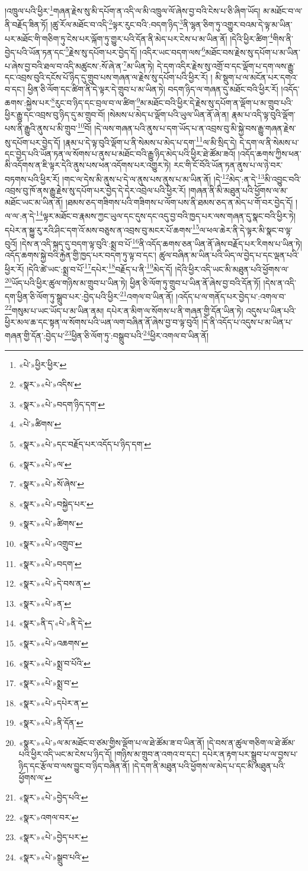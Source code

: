 །འཁྲུལ་པའི་ཕྱིར་\footnote{«པེ་»ཕྱིར་ཕྱིར་}གཞན་རྗེས་སུ་མི་དཔོག་ན་འདི་ལ་མི་འཁྲུལ་ལོ་ཞེས་བྱ་བའི་ངེས་པ་ཅི་ཞིག་ཡོད། མ་མཐོང་བ་ལ་ནི་བརྗོད་ཟིན་ཏོ། །ཚུ་རོལ་མཐོང་བ་འདི་\footnote{«སྣར་»«པེ་»འདིས་}ལྟར་རུང་བའི་:བདག་ཉིད་\footnote{«སྣར་»«པེ་»བདག་ཉིད་དག་}ནི་ལྷན་ཅིག་ཏུ་འགྱུར་བའམ་དེ་ལྟ་མ་ཡིན་པར་མཐོང་གི་གཅིག་ཏུ་ངེས་པར་ལྐོག་ཏུ་གྱུར་པའི་དོན་ནི་མེད་པར་ངེས་པ་མ་ཡིན་ནོ། །དེའི་ཕྱིར་ཚིག་\footnote{«པེ་»ཚིགས་}གིས་ནི་བྱེད་པའི་ཡོན་ཏན་དང་\footnote{«སྣར་»«པེ་»དང་བརྗོད་པར་འདོད་པ་ཉིད་དག་}རྗེས་སུ་དཔོག་པར་བྱེད་དོ། །འདིར་ཡང་བདག་ལས་\footnote{«སྣར་»«པེ་»ལ་}མཐོང་བས་རྗེས་སུ་དཔོག་པ་མ་ཡིན་པ་ཞེས་བྱ་བའི་ཐལ་བ་འདི་མཚུངས་:སོ་ཞེ་ན་\footnote{«སྣར་»«པེ་»སོ་ཞེས་}མ་ཡིན་ཏེ། དེ་དག་འདིར་རྗེས་སུ་འགྲོ་བ་དང་ལྡོག་པ་དག་ལས་རྒྱུ་དང་འབྲས་བུའི་དངོས་པོ་ཉིད་དུ་གྲུབ་པས་གཞན་ལ་རྗེས་སུ་དཔོག་པའི་ཕྱིར་རོ། །
མི་སྡུག་པ་ལ་མངོན་པར་དགའ་བ་དང་། ཕྱིན་ཅི་ལོག་དང་ཚིག་ནི་དེ་ལྟར་དེ་གྲུབ་པ་མ་ཡིན་ཏེ། བདག་ཉིད་ལ་གཞན་དུ་མཐོང་བའི་ཕྱིར་རོ། །འདོད་ཆགས་:སྐྱེས་པར་\footnote{«སྣར་»«པེ་»བསྐྱེད་པར་}རུང་བ་ཉིད་དང་བྲལ་བ་ལ་ཚིག་\footnote{«སྣར་»«པེ་»ཚིགས་}མ་མཐོང་བའི་ཕྱིར་དེ་རྗེས་སུ་དཔོག་ན་ལྡོག་པ་མ་གྲུབ་པའི་ཕྱིར་རྒྱུ་དང་འབྲས་བུ་ཉིད་དུ་མ་གྲུབ་བོ། །སེམས་པ་མེད་པ་ལྡོག་པའི་ཡུལ་ཡིན་ནོ་ཞེ་ན། རྣམ་པ་འདི་ལྟ་བུའི་ལྡོག་པས་ནི་རྒྱུའི་ནུས་པ་མི་གྲུབ་\footnote{«སྣར་»«པེ་»འགྲུབ་}བོ། །དེ་ལས་གཞན་པའི་ནུས་པ་དག་ཡོད་པ་ན་འབྲས་བུ་མི་སྐྱེ་བས་རྒྱུ་གཞན་རྗེས་སུ་དཔོག་པར་བྱེད་དོ། །རྣམ་པ་དེ་ལྟ་བུའི་ལྡོག་པ་ནི་སེམས་པ་མེད་པ་དག་\footnote{«སྣར་»«པེ་»བདག་}ལ་མི་སྲིད་དེ། དེ་དག་ལ་ནི་སེམས་པ་དང་བྱེད་པའི་ཡོན་ཏན་ལ་སོགས་པ་ནུས་པ་མཐོང་བའི་རྒྱུ་ཉིད་མེད་པའི་ཕྱིར་ཐེ་ཚོམ་ཟའོ། །འདོད་ཆགས་ཀྱིས་ཕན་མི་འདོགས་ན་ཇི་ལྟར་དེའི་ནུས་པས་ཕན་འདོགས་པར་འགྱུར་ཏེ། རང་གི་ངོ་བོའི་ཡོན་ཏན་ནུས་པ་ལ་ཉེ་བར་བཏགས་པའི་ཕྱིར་རོ། །གང་ལ་དེས་མི་ནུས་པ་དེ་ལ་ནུས་པས་ནུས་པ་མ་ཡིན་ནོ། །དེ་\footnote{«སྣར་»«པེ་»དེ་བས་ན་}མེད་:ན་དེ་\footnote{«སྣར་»«པེ་»ན་}མི་འབྱུང་བའི་འབྲས་བུ་ཁོ་ནས་རྒྱུ་རྗེས་སུ་དཔོག་པར་བྱེད་དེ་དེར་འབྲེལ་པའི་ཕྱིར་རོ། །གཞན་ནི་མི་མཐུན་པའི་ཕྱོགས་ལ་མ་མཐོང་ཡང་མ་ཡིན་ནོ། །ཐམས་ཅད་གཟིགས་པའི་གཟིགས་པ་ལོག་པས་ནི་ཐམས་ཅད་ན་མེད་པ་གོ་བར་བྱེད་དོ། །ལ་ལ་:ན་དེ་\footnote{«སྣར་»ནི་ད་«པེ་»ནི་དེ་}ལྟར་མཐོང་བ་རྣམས་ཀྱང་ཡུལ་དང་དུས་དང་འདུ་བྱ་བའི་ཁྱད་པར་ལས་གཞན་དུ་སྣང་བའི་ཕྱིར་ཏེ། དཔེར་ན་སྐྱུ་རུ་རའི་ཤིང་དག་འོ་མས་བཅུས་ན་འབྲས་བུ་མངར་པོ་ཆགས་\footnote{«སྣར་»«པེ་»འཆགས་}ལ་ཕལ་ཆེར་ནི་དེ་ལྟར་མི་སྣང་བ་ལྟ་བུའོ། །དེས་ན་འདི་སྐད་དུ་བདག་ལྟ་བུའི་:སྨྲ་བ་པོ་\footnote{«སྣར་»«པེ་»སྨྲ་བ་པོའི་}ནི་འདོད་ཆགས་ཅན་ཡིན་ནོ་ཞེས་བརྗོད་པར་རིགས་པ་ཡིན་ཏེ། འདོད་ཆགས་སྐྱེ་བའི་རྐྱེན་གྱི་ཁྱད་པར་བདག་ཏུ་ལྟ་བ་དང་། ཚུལ་བཞིན་མ་ཡིན་པའི་ཡིད་ལ་བྱེད་པ་དང་ལྡན་པའི་ཕྱིར་རོ། །དེའི་ཚེ་ཡང་:སྨྲ་བ་པོ་\footnote{«སྣར་»«པེ་»སྨྲ་བ་}དཔེར་\footnote{«སྣར་»«པེ་»དཔེར་ན་}བརྗོད་པ་ནི་\footnote{«སྣར་»«པེ་»ནི་དོན་}མེད་དོ། །དེའི་ཕྱིར་འདི་ཡང་མི་མཐུན་པའི་ཕྱོགས་ལ་\footnote{«སྣར་»«པེ་»ལ་མ་མཐོང་བ་ཙམ་གྱིས་ལྡོག་པ་ལ་ཐེ་ཚོམ་ཟ་བ་ཡིན་ནོ། །དེ་བས་ན་ཚུལ་གཅིག་ལ་ཐེ་ཚོམ་པའི་ཕྱིར་འདི་ཡང་མ་ངེས་པ་ཉིད་དོ། །གཉིས་མ་གྲུབ་ན་འགའ་བ་དང་། དཔེར་ན་རྟག་པར་སྒྲུབ་པ་ལ་བྱས་པ་ཉིད་དང་རྩོལ་བ་ལས་བྱུང་བ་ཉིད་བཞིན་ནོ། །དེ་དག་ནི་མཐུན་པའི་ཕྱོགས་ལ་མེད་པ་དང་མི་མཐུན་པའི་ཕྱོགས་ལ་}ཡོད་པའི་ཕྱིར་ཚུལ་གཉིས་མ་གྲུབ་པ་ཡིན་ཏེ། ཕྱིན་ཅི་ལོག་ཏུ་གྲུབ་པ་ཡིན་ནོ་ཞེས་བྱ་བའི་དོན་ཏོ། །དེས་ན་འདི་དག་ཕྱིན་ཅི་ལོག་ཏུ་སྒྲུབ་པར་:བྱེད་པའི་ཕྱིར་\footnote{«སྣར་»«པེ་»བྱེད་པའི་}འགལ་བ་ཡིན་ནོ། །འདོད་པ་ལ་གནོད་པར་བྱེད་པ་:འགལ་བ་\footnote{«སྣར་»འགལ་བར་}གསུམ་པ་ཡང་ཡོད་པ་མ་ཡིན་ནམ། དཔེར་ན་མིག་ལ་སོགས་པ་ནི་གཞན་གྱི་དོན་ཡིན་ཏེ། འདུས་པ་ཡིན་པའི་ཕྱིར་མལ་ཆ་དང་སྟན་ལ་སོགས་པའི་ཡན་ལག་བཞིན་ནོ་ཞེས་བྱ་བ་ལྟ་བུའོ། །དེ་ནི་འདོད་པ་འདུས་པ་མ་ཡིན་པ་གཞན་གྱི་དོན་:བྱེད་པ་\footnote{«སྣར་»«པེ་»བྱེད་པར་}ཕྱིན་ཅི་ལོག་ཏུ་:བསྒྲུབ་པའི་\footnote{«སྣར་»«པེ་»སྒྲུབ་པའི་}ཕྱིར་འགལ་བ་ཡིན་ནོ། 